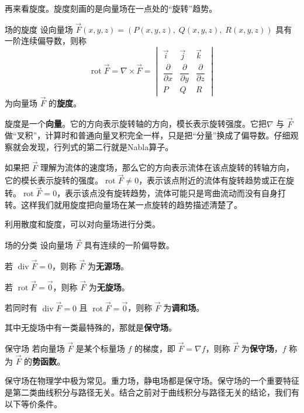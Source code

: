 再来看旋度。旋度刻画的是向量场在一点处的“旋转”趋势。

\begin{definition}{场的旋度}{}
  设向量场 \(\vec{F}(x,y,z)=(P(x,y,z),\;Q(x,y,z),\;R(x,y,z))\) 具有一阶连续偏导数，则称
  \[
  \operatorname{rot}\vec{F} = \nabla \times \vec{F}
  =
  \begin{vmatrix}
  \vec{i} & \vec{j} & \vec{k} \\[2pt]
  \dfrac{\partial}{\partial x} & \dfrac{\partial}{\partial y} & \dfrac{\partial}{\partial z} \\[6pt]
  P & Q & R
  \end{vmatrix}
  \]
  为向量场 \(\vec{F}\) 的\textbf{旋度}。
\end{definition}

旋度是一个\textbf{向量}。它的方向表示旋转轴的方向，模长表示旋转强度。它把\(\nabla\) 与 \(\vec{F}\) 做“叉积”，计算时和普通向量叉积完全一样，只是把“分量”换成了偏导数。仔细观察就会发现，行列式的第二行就是Nabla算子。

如果把 \(\vec{F}\) 理解为流体的速度场，那么它的方向表示流体在该点旋转的转轴方向，它的模长表示旋转的强度。\(\operatorname{rot}\vec{F} \ne 0\)，表示该点附近的流体有旋转趋势或正在旋转。\(\operatorname{rot}\vec{F} = 0\)，表示该点没有旋转趋势，流体可能只是弯曲流动而没有自身打转。这样我们就用旋度把向量场在某一点旋转的趋势描述清楚了。

利用散度和旋度，可以对向量场进行分类。

\begin{definition}{场的分类}{}
  设向量场 \(\vec{F}\) 具有连续的一阶偏导数。

  若 \(\operatorname{div}\vec{F}=0\)，则称 \(\vec{F}\) 为\textbf{无源场}。

  若 \(\operatorname{rot}\vec{F}=\vec{0}\)，则称 \(\vec{F}\) 为\textbf{无旋场}。

  若同时有 \(\operatorname{div}\vec{F}=0\) 且 \(\operatorname{rot}\vec{F}=\vec{0}\)，则称 \(\vec{F}\) 为\textbf{调和场}。
\end{definition}

其中无旋场中有一类最特殊的，那就是\textbf{保守场}。

\begin{definition}{保守场}{}
  若向量场 \(\vec{F}\) 是某个标量场 \(f\) 的梯度，即 \(\vec{F}=\nabla f\)，则称 \(\vec{F}\) 为\textbf{保守场}，\(f\) 称为 \(\vec{F}\) 的\textbf{势函数}。
\end{definition}

保守场在物理学中极为常见。重力场，静电场都是保守场。保守场的一个重要特征是第二类曲线积分与路径无关。结合之前对于曲线积分与路径无关的结论，我们有以下等价条件。


